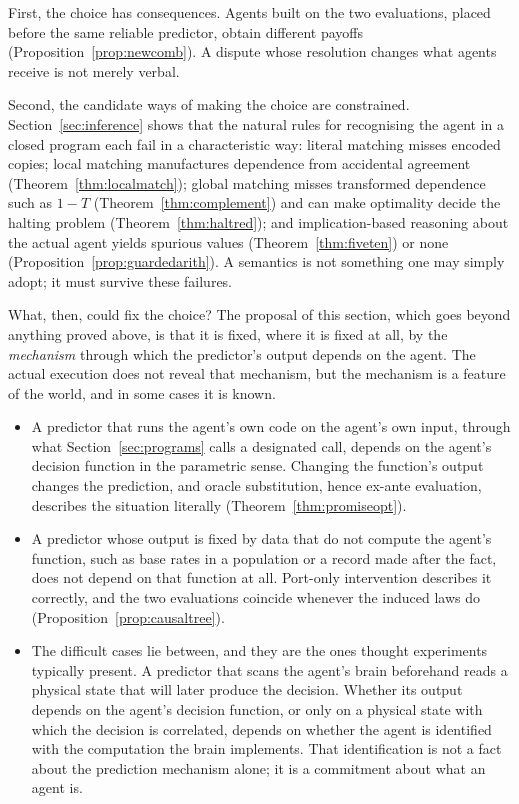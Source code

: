 First, the choice has consequences. Agents built on the two evaluations, placed before the same
reliable predictor, obtain different payoffs (Proposition~\ref{prop:newcomb}). A dispute whose
resolution changes what agents receive is not merely verbal.

Second, the candidate ways of making the choice are constrained. Section~\ref{sec:inference} shows
that the natural rules for recognising the agent in a closed program each fail in a characteristic
way: literal matching misses encoded copies; local matching manufactures dependence from accidental
agreement (Theorem~\ref{thm:localmatch}); global matching misses transformed dependence such as $1-T$
(Theorem~\ref{thm:complement}) and can make optimality decide the halting problem
(Theorem~\ref{thm:haltred}); and implication-based reasoning about the actual agent yields spurious
values (Theorem~\ref{thm:fiveten}) or none (Proposition~\ref{prop:guardedarith}). A semantics is not
something one may simply adopt; it must survive these failures.

What, then, could fix the choice? The proposal of this section, which goes beyond anything proved
above, is that it is fixed, where it is fixed at all, by the \emph{mechanism} through which the
predictor's output depends on the agent. The actual execution does not reveal that mechanism, but
the mechanism is a feature of the world, and in some cases it is known.
\begin{itemize}
  \item A predictor that runs the agent's own code on the agent's own input, through what
        Section~\ref{sec:programs} calls a designated call, depends on the agent's decision function
        in the parametric sense. Changing the function's output changes the prediction, and oracle
        substitution, hence ex-ante evaluation, describes the situation literally
        (Theorem~\ref{thm:promiseopt}).
  \item A predictor whose output is fixed by data that do not compute the agent's function, such as
        base rates in a population or a record made after the fact, does not depend on that function
        at all. Port-only intervention describes it correctly, and the two evaluations coincide
        whenever the induced laws do (Proposition~\ref{prop:causaltree}).
  \item The difficult cases lie between, and they are the ones thought experiments typically
        present. A predictor that scans the agent's brain beforehand reads a physical state that will
        later produce the decision. Whether its output depends on the agent's decision function, or
        only on a physical state with which the decision is correlated, depends on whether the agent
        is identified with the computation the brain implements. That identification is not a fact
        about the prediction mechanism alone; it is a commitment about what an agent is.
\end{itemize}

